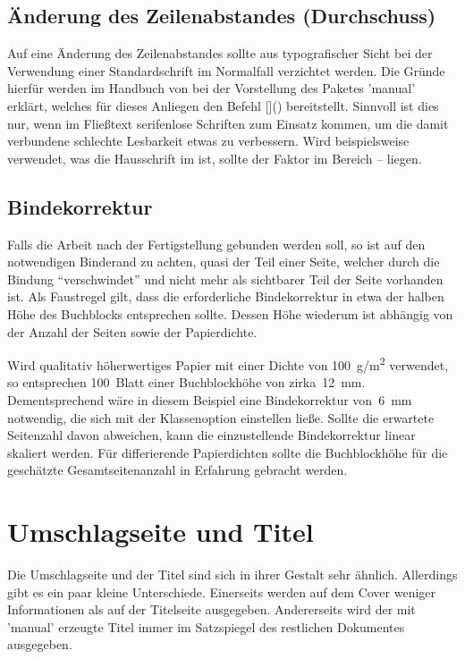 \documentclass[%
  english,ngerman,%
  cdgeometry=no,DIV=12,%
  automark,%
  listof=toc,%
]{tudscrartcl}
\begin{document}
\subsection{Änderung des Zeilenabstandes (Durchschuss)}
Auf eine Änderung des Zeilenabstandes sollte aus typografischer Sicht bei der 
Verwendung einer Standardschrift im Normalfall verzichtet werden. Die Gründe 
hierfür werden im Handbuch von \TUDScript bei der Vorstellung des Paketes 
'manual' erklärt, welches für dieses Anliegen den Befehl 
[]() bereitstellt. 
Sinnvoll ist dies nur, wenn im Fließtext serifenlose Schriften zum Einsatz 
kommen, um die damit verbundene schlechte Lesbarkeit etwas zu verbessern.
Wird beispielsweise \OpenSans verwendet, was die Hausschrift im \TUDCD ist, 
sollte der Faktor im Bereich -- liegen.


\subsection{Bindekorrektur}
\label{sec:bcor}%
%
Falls die Arbeit nach der Fertigstellung gebunden werden soll, so ist auf den 
notwendigen Binderand zu achten, quasi der Teil einer Seite, welcher durch die 
Bindung \enquote{verschwindet} und nicht mehr als sichtbarer Teil der Seite 
vorhanden ist. Als Faustregel gilt, dass die erforderliche Bindekorrektur in 
etwa der halben Höhe des Buchblocks entsprechen sollte. Dessen Höhe wiederum 
ist abhängig von der Anzahl der Seiten sowie der Papierdichte.

Wird qualitativ höherwertiges Papier mit einer Dichte von \SI{100}{g/m^2} 
verwendet, so entsprechen 100~Blatt einer Buchblockhöhe von zirka~\SI{12}{mm}. 
Dementsprechend wäre in diesem Beispiel eine Bindekorrektur von~\SI{6}{mm} 
notwendig, die sich mit der Klassenoption  einstellen ließe. 
Sollte die erwartete Seitenzahl davon abweichen, kann die einzustellende 
Bindekorrektur linear skaliert werden. Für differierende Papierdichten sollte 
die Buchblockhöhe für die geschätzte Gesamtseitenanzahl in Erfahrung gebracht 
werden.



\section{Umschlagseite und Titel}
Die Umschlagseite und der Titel sind sich in ihrer Gestalt sehr ähnlich. 
Allerdings gibt es ein paar kleine Unterschiede. Einerseits werden auf dem 
Cover weniger Informationen als auf der Titelseite ausgegeben. Andererseits 
wird der mit 'manual' erzeugte Titel immer im Satzspiegel des 
restlichen Dokumentes ausgegeben.
\end{document}
